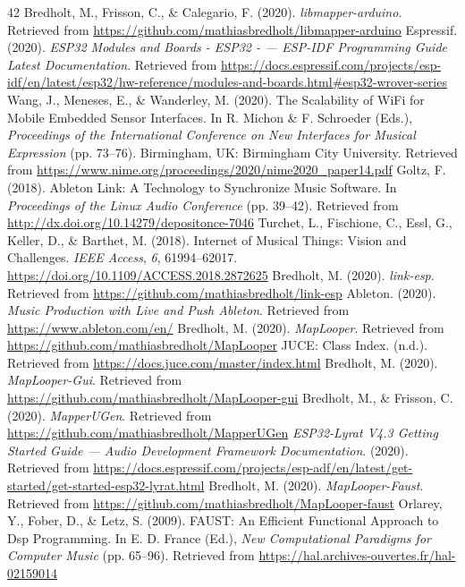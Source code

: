 \documentclass[sigconf]{nimeart}
\begin{document}
\begin{thebibliography}{42}
 {{ }}  Bredholt, M., Frisson, C., \& Calegario, F. (2020). \emph{libmapper-arduino}. Retrieved from \url{https://github.com/mathiasbredholt/libmapper-arduino}{}
 {{ }}  Espressif. (2020). \emph{ESP32 Modules and Boards - ESP32 - --- ESP-IDF Programming Guide Latest Documentation}. Retrieved from \url{https://docs.espressif.com/projects/esp-idf/en/latest/esp32/hw-reference/modules-and-boards.html\#esp32-wrover-series}{}
 {{ }}  Wang, J., Meneses, E., \& Wanderley, M. (2020). The Scalability of WiFi for Mobile Embedded Sensor Interfaces. In R. Michon \& F. Schroeder (Eds.), \emph{Proceedings of the International Conference on New Interfaces for Musical Expression} (pp. 73--76). Birmingham, UK: Birmingham City University. Retrieved from \url{https://www.nime.org/proceedings/2020/nime2020_paper14.pdf}{}
 {{ }}  Goltz, F. (2018). Ableton Link: A Technology to Synchronize Music Software. In \emph{Proceedings of the Linux Audio Conference} (pp. 39--42). Retrieved from \url{http://dx.doi.org/10.14279/depositonce-7046}{}
 {{ }}  Turchet, L., Fischione, C., Essl, G., Keller, D., \& Barthet, M. (2018). Internet of Musical Things: Vision and Challenges. \emph{IEEE Access}, \emph{6}, 61994--62017. \url{https://doi.org/10.1109/ACCESS.2018.2872625}{}
 {{ }}  Bredholt, M. (2020). \emph{link-esp}. Retrieved from \url{https://github.com/mathiasbredholt/link-esp}{}
 {{ }}  Ableton. (2020). \emph{Music Production with Live and Push \textbar{} Ableton}. Retrieved from \url{https://www.ableton.com/en/}{}
 {{ }}  Bredholt, M. (2020). \emph{MapLooper}. Retrieved from \url{https://github.com/mathiasbredholt/MapLooper}{}
 {{ }}  JUCE: Class Index. (n.d.). Retrieved from \url{https://docs.juce.com/master/index.html}{}
 {{ }}  Bredholt, M. (2020). \emph{MapLooper-Gui}. Retrieved from \url{https://github.com/mathiasbredholt/MapLooper-gui}{}
 {{ }}  Bredholt, M., \& Frisson, C. (2020). \emph{MapperUGen}. Retrieved from \url{https://github.com/mathiasbredholt/MapperUGen}{}
 {{ }}  \emph{ESP32-Lyrat V4.3 Getting Started Guide --- Audio Development Framework Documentation}. (2020). Retrieved from \url{https://docs.espressif.com/projects/esp-adf/en/latest/get-started/get-started-esp32-lyrat.html}{}
 {{ }}  Bredholt, M. (2020). \emph{MapLooper-Faust}. Retrieved from \url{https://github.com/mathiasbredholt/MapLooper-faust}{}
 {{ }}  Orlarey, Y., Fober, D., \& Letz, S. (2009). FAUST: An Efficient Functional Approach to Dsp Programming. In E. D. France (Ed.), \emph{New Computational Paradigms for Computer Music} (pp. 65--96). Retrieved from \url{https://hal.archives-ouvertes.fr/hal-02159014}{}

\end{thebibliography}
\end{document}
